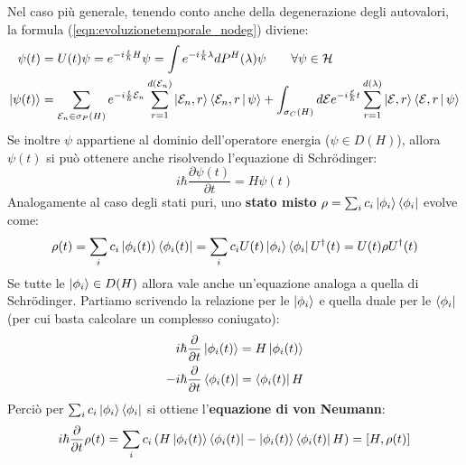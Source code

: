 \documentclass[../../FisicaTeorica.tex]{subfiles}
\begin{document}
Nel caso più generale, tenendo conto anche della degenerazione degli autovalori, la formula (\ref{eqn:evoluzionetemporale_nodeg}) diviene:
\begin{align}
    \psi(t)&=U(t)\psi = e^{-i\frac{t}{\hbar}H}\psi=\int e^{-i\frac{t}{\hbar}\lambda}dP^H(\lambda)\psi \qquad \forall \psi \in \mathcal{H}\nonumber\\
    \Ket{\psi(t)} &= \sum_{\mathcal{E}_n\in \sigma_P(H)} e^{-i\frac{t}{\hbar}\mathcal{E}_n}\sum_{r=1}^{d(\mathcal{E}_n)}\Ket{\mathcal{E}_{n},r}\Braket{\mathcal{E}_{n},r|\psi}
+\int_{\sigma_C(H)}d\mathcal{E} e^{-i\frac{\mathcal{E}}{\hbar}t}\sum_{r=1}^{d(\lambda)}\Ket{\mathcal{E},r}\Braket{\mathcal{E},r|\psi}
\label{eqn:evoluzione_temporale_totale}
\end{align}
Se inoltre $\psi$ appartiene al dominio dell'operatore energia ($\psi \in D(H)$), allora $\psi(t)$ si può ottenere anche risolvendo l'equazione di Schrödinger:
\[
i\hbar \frac{\partial \psi(t)}{\partial t}=H\psi(t)
\]
Analogamente al caso degli stati puri,  uno \textbf{stato misto} $\rho=\sum_i c_i\Ket{\phi_i}\Bra{\phi_i}$ evolve come:
\begin{align}
\rho(t)=\sum_i c_i\Ket{\phi_i(t)}\Bra{\phi_i(t)}=\sum_i c_i U(t)\Ket{\phi_i}\Bra{\phi_i}U^\dag(t)=U(t)\rho U^\dag(t)
\label{eqn:rho_mista}
\end{align}
Se tutte le $\Ket{\phi_i}\in D(H)$ allora vale anche un'equazione analoga a quella di Schrödinger. Partiamo scrivendo la relazione per le $\Ket{\phi_i}$ e quella duale per le $\Bra{\phi_i}$ (per cui basta calcolare un complesso coniugato):
\begin{align*}
i\hbar \frac{\partial}{\partial t}\Ket{\phi_i(t)} &= H\Ket{\phi_i(t)}\\
-i\hbar \frac{\partial}{\partial t}\Bra{\phi_i(t)}&=\Bra{\phi_i(t)}H
\end{align*}
Perciò per $\sum_i c_i \Ket{\phi_i}\Bra{\phi_i}$ si ottiene l'\textbf{equazione di von Neumann}:\\
\begin{equation}
i\hbar \frac{\partial}{\partial t}\rho(t) = \sum_i c_i\left(H\Ket{\phi_i(t)}\Bra{\phi_i(t)}-\Ket{\phi_i(t)}\Bra{\phi_i(t)}H \right) = [H,\rho(t)]
\end{equation}
\end{document}
